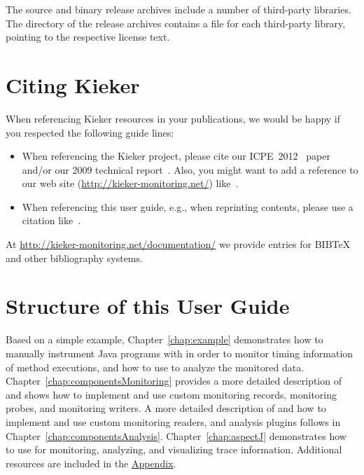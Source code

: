 The \Kieker{} source and binary release archives include a number of third-party %
libraries. %
The  directory of the release archives contains a %
 file for each third-party library, pointing to the respective license text.

\section{Citing Kieker}\label{sec:ch1:citingKieker}

When referencing Kieker resources in your publications, we would be happy if you %
respected the following guide lines:

\begin{itemize}
\item When referencing the Kieker project, please cite our %
ICPE~2012~\cite{KiekerICPE2012} paper and/or our 2009 technical report~\cite{vanHoornRohrHasselbringWallerEhlersFreyKieselhorst2009TRContinuousMonitoringOfSoftwareServicesDesignAndApplicationOfTheKiekerFramework}. %
Also, you might want to add a reference to our web site (\url{http://kieker-monitoring.net/}) %
like~\cite{KiekerWebSite}. 
\item When referencing this user guide, e.g., when reprinting contents, please %
use a citation like~\cite{Kieker1.7UserGuide}.
\end{itemize}

\noindent At \url{http://kieker-monitoring.net/documentation/} we provide %
entries for $\mathrm{B\scriptstyle IB}\!$\TeX{} and other bibliography %
systems.

\section{Structure of this User Guide}

Based on a simple example, Chapter~\ref{chap:example} demonstrates %
how to manually instrument Java programs with \KiekerMonitoringPart{} %
in order to monitor timing information of method executions, and %
how to use \KiekerAnalysisPart{} to analyze the monitored data. %
Chapter~\ref{chap:componentsMonitoring} provides a more detailed %
description of \KiekerMonitoringPart{} and shows how to implement and %
use custom monitoring records, monitoring probes, and monitoring writers. %
A more detailed description of \KiekerAnalysisPart{} and how to implement and use %
custom monitoring readers, and analysis plugins follows in %
Chapter~\ref{chap:componentsAnalysis}. %
Chapter~\ref{chap:aspectJ} demonstrates how to use \KiekerTraceAnalysis{} %
for monitoring, analyzing, and visualizing trace information. %
Additional resources are included in the \hyperlink{hypertarget:appendix}{Appendix}.

